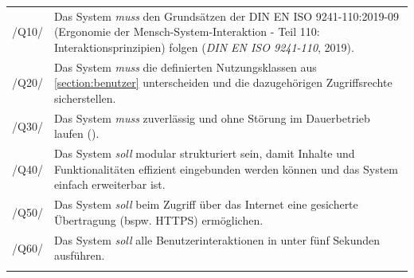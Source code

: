 \begin{center}
        \renewcommand{\arraystretch}{1.5}
        \begin{longtable}{lp{}} \arrayrulecolor{maincolor}\hline
                \sffamily\color{maincolor}/Q10/ & Das System \textit{muss} den Grundsätzen der DIN
                EN ISO 9241-110:2019-09 (Ergonomie der Mensch-System-Interaktion - Teil 110:
                Interaktionsprinzipien) folgen (\textit{DIN EN ISO 9241-110}, 2019).               \\
                \sffamily\color{maincolor}/Q20/ & Das System \textit{muss} die definierten
                Nutzungsklassen aus \ref{section:benutzer} unterscheiden und die dazugehörigen
                Zugriffsrechte sicherstellen.                                                      \\
                \sffamily\color{maincolor}/Q30/ & Das System \textit{muss} zuverlässig und ohne
                Störung im Dauerbetrieb laufen (\nameref{section:zeit}).                           \\
                \sffamily\color{maincolor}/Q40/ & Das System \textit{soll} modular strukturiert
                sein, damit Inhalte und Funktionalitäten effizient eingebunden werden können und das
                System einfach erweiterbar ist.                                                    \\
                \sffamily\color{maincolor}/Q50/ & Das System \textit{soll} beim Zugriff über das
                Internet eine gesicherte Übertragung (bspw. \ac{HTTPS}) ermöglichen.               \\
                \sffamily\color{maincolor}/Q60/ & Das System \textit{soll} alle
                Benutzerinteraktionen in unter fünf Sekunden ausführen.                            \\
                \arrayrulecolor{maincolor}\hline
        \end{longtable}
\end{center}

